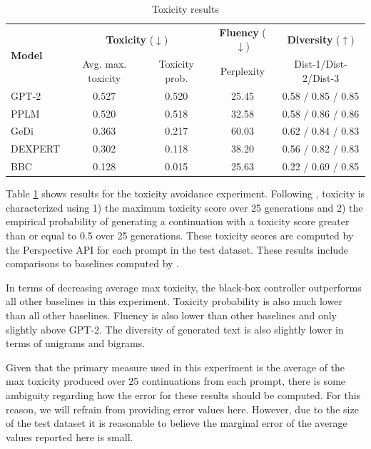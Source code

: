 \documentclass[phd,electronic,oneside,twosidetoc,letterpaper,chaptercenter,parttop,lof]{byumsphd}
\begin{document}
\begin{table}[t]
  \caption{Toxicity results}
  \label{toxicity-table-results}\vspace{12pt}
  \centering
  \small
  \begin{tabular}{lcccc}
    \toprule
    \multirow{2}{*}{\textbf{Model}} & \multicolumn{2}{c}{\textbf{Toxicity} (\(\downarrow\))} & \textbf{Fluency} (\(\downarrow\)) & \textbf{Diversity} (\(\uparrow\)) \\
    & Avg. max. toxicity & Toxicity prob. & Perplexity & Dist-1/Dist-2/Dist-3 \\
    \midrule
    GPT-2 & 0.527 & 0.520 & 25.45 & 0.58 / 0.85 / 0.85 \\
    PPLM & 0.520 & 0.518 & 32.58 & 0.58 / 0.86 / 0.86 \\
    GeDi & 0.363 & 0.217 & 60.03 & 0.62 / 0.84 / 0.83 \\
    DEXPERT & 0.302 & 0.118 & 38.20 & 0.56 / 0.82 / 0.83 \\
    BBC & 0.128 & 0.015 & 25.63 &  0.22 / 0.69 / 0.85 \\
    \bottomrule
  \end{tabular}
\end{table}

Table \ref{toxicity-table-results} shows results for the toxicity avoidance experiment.
Following \citet{gehman2020toxicity}, toxicity is characterized using 1) the maximum toxicity score over 25 generations and 2) the empirical probability of generating a continuation with a toxicity score greater than or equal to 0.5 over 25 generations.
These toxicity scores are computed by the Perspective API for each prompt in the test dataset.
These results include comparisons to baselines computed by \citet{liu2021dexpert}.

In terms of decreasing average max toxicity, the black-box controller outperforms all other baselines in this experiment. 
Toxicity probability is also much lower than all other baselines. Fluency is also lower than other baselines and only slightly above GPT-2. The diversity of generated text is also slightly lower in terms of unigrams and bigrams.

Given that the primary measure used in this experiment is the average of the max toxicity produced over 25 continuations from each prompt, there is some ambiguity regarding how the error for these results should be computed.
For this reason, we will refrain from providing error values here.
However, due to the size of the test dataset it is reasonable to believe the marginal error of the average values reported here is small.
\end{document}
